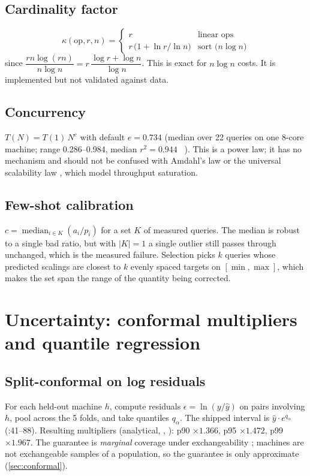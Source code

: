 \subsection{Cardinality factor}
\begin{equation}
\kappa(\text{op},r,n)=\begin{cases} r & \text{linear ops}\\[2pt] r\,\big(1+\ln r/\ln n\big)& \text{sort (}n\log n\text{)}\end{cases}
\end{equation}
since $\dfrac{rn\log(rn)}{n\log n}=r\,\dfrac{\log r+\log n}{\log n}$. This is exact for $n\log n$ costs. It is implemented but not validated against data.

\subsection{Concurrency}
$T(N)=T(1)\,N^{e}$ with default $e=0.734$ (median over 22 queries on one 8-core machine; range 0.286--0.984,
median $r^2=0.944$ \evFILE\ ). This is a power law; it has no mechanism and
should not be confused with Amdahl's law \citep{amdahl:1967} or the universal scalability law \citep{gunther:usl}, which model throughput saturation.

\subsection{Few-shot calibration}
$c=\operatorname{median}_{i\in K}(a_i/p_i)$ for a set $K$ of measured queries. The median is robust to a single bad
ratio, but with $|K|=1$ a single outlier still passes through unchanged, which is the measured failure.
Selection picks $k$ queries whose predicted scalings are closest to $k$ evenly spaced targets on $[\min,\max]$, which
makes the set span the range of the quantity being corrected.

\section{Uncertainty: conformal multipliers and quantile regression}\label{sec:conformal-method}
\subsection{Split-conformal on log residuals}
For each held-out machine $h$, compute residuals $\epsilon=\ln(y/\hat y)$ on pairs involving $h$, pool across the 5 folds, and take quantiles
$q_\alpha$. The shipped interval is $\hat y\cdot e^{q_\alpha}$ (:41--88).
Resulting multipliers (analytical, , \evFILE): p90 $\times1.366$, p95 $\times1.472$, p99 $\times1.967$.
The guarantee is \emph{marginal} coverage under exchangeability \citep{angelopoulos:gentle}; machines are not exchangeable
samples of a population, so the guarantee is only approximate (\cref{sec:conformal}).

